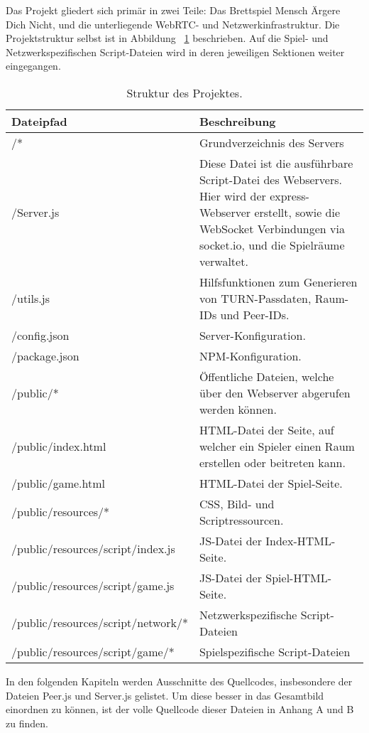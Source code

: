 Das Projekt gliedert sich primär in zwei Teile: Das Brettspiel \glqq{}Mensch Ärgere Dich Nicht\grqq{}, und die unterliegende \acs{WebRTC}- und Netzwerkinfrastruktur. Die Projektstruktur selbst ist in Abbildung~ \ref{table:projectfiles} beschrieben. Auf die Spiel- und Netzwerkspezifischen Script-Dateien wird in deren jeweiligen Sektionen weiter eingegangen.\par

\begin{table}[ht]
\centering
\begin{tabularx}{\textwidth}{lX}
\toprule
Dateipfad&Beschreibung\\
\midrule
/*&Grundverzeichnis des Servers\\
/Server.js&Diese Datei ist die ausführbare Script-Datei des Webservers. Hier wird der express-Webserver erstellt, sowie die WebSocket Verbindungen via socket.io, und die Spielräume verwaltet.\\
/utils.js&Hilfsfunktionen zum Generieren von TURN-Passdaten, Raum-IDs und Peer-IDs.\\
/config.json&Server-Konfiguration.\\
/package.json&NPM-Konfiguration.\\
\midrule
/public/*&Öffentliche Dateien, welche über den Webserver abgerufen werden können.\\
/public/index.html&HTML-Datei der Seite, auf welcher ein Spieler einen Raum erstellen oder beitreten kann.\\
/public/game.html&HTML-Datei der Spiel-Seite.\\
\midrule
/public/resources/*&CSS, Bild- und Scriptressourcen.\\
/public/resources/script/index.js&JS-Datei der Index-HTML-Seite.\\
/public/resources/script/game.js&JS-Datei der Spiel-HTML-Seite.\\
\midrule
/public/resources/script/network/*&Netzwerkspezifische Script-Dateien\\
/public/resources/script/game/*&Spielspezifische Script-Dateien\\
\bottomrule
\end{tabularx}
\caption{Struktur des Projektes.}
\label{table:projectfiles}
\end{table}

In den folgenden Kapiteln werden Ausschnitte des Quellcodes, insbesondere der Dateien Peer.js und Server.js gelistet. Um diese besser in das Gesamtbild einordnen zu können, ist der volle Quellcode dieser Dateien in Anhang A und B zu finden.\par

